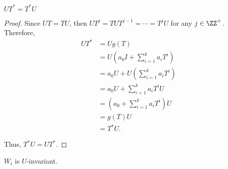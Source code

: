 \documentclass[11pt]{scrartcl}
\begin{document}
\begin{lemma}
          $UT^{*} = T^{*}U$
\end{lemma}
\begin{proof}
  \hfill

  Since $UT = TU$, then $UT^j =TUT^{j-1} = \cdots =  T^jU$ for any $j\in\ZZ^+$. Therefore, 
  \begin{align}
    UT^{*} &= Ug(T)\\
           &= U(a_0I+\sum_{i=1}^ka_iT^i)\\
           &=a_0U+U(\sum_{i=1}^ka_iT^i)\\
           &=a_0U+\sum_{i=1}^ka_iT^iU\\
           &=(a_0+\sum_{i=1}^ka_iT^i)U\\
           &= g(T)U\\
           &= T^{*}U.
  \end{align}


  Thus, $T^{*}U = UT^{*}$.
\end{proof}

\begin{lemma}
  \label{sec:problem-iv}
  $W_i$ is $U$-invariant.
\end{lemma}
\end{document}
